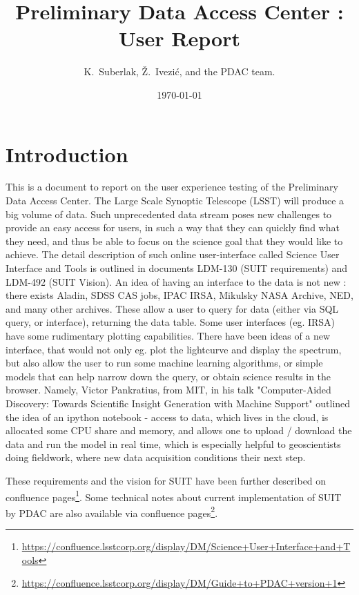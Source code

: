 \documentclass[DM,lsstdraft,toc,usenatbib]{lsstdoc}
\title[PDAC report]{Preliminary Data Access Center : User Report}
\author{
K.~Suberlak,
\v{Z}.~Ivezi\'c,
and the PDAC team.}
\date{\today}
\begin{document}
\maketitle

\section{Introduction}

This is a document to report on the user experience testing of the Preliminary Data Access Center.  The Large Scale Synoptic Telescope      (LSST)  will  produce a big volume of data. Such unprecedented data stream poses new challenges  to provide an easy access for users, in such a way that they can quickly find what they need, and thus be able to focus on the science goal that they would like to achieve.  The detail description of  such online user-interface called Science User Interface and Tools is outlined in documents LDM-130 (SUIT requirements)  and LDM-492  (SUIT Vision).  
An idea of having an interface to the data is not new : there exists Aladin,  SDSS CAS jobs,  IPAC  IRSA,  Mikulsky NASA Archive, NED, and many other archives. These allow a user to query for data (either via SQL query, or interface), returning the data table. Some user interfaces (eg. IRSA) have some rudimentary plotting capabilities.  There have been ideas of a new  interface, that would not only eg. plot the lightcurve and display the spectrum,  but also allow the user to run some machine learning algorithms, or simple models that can help narrow down the query, or obtain science results in the browser.  Namely, Victor Pankratius, from MIT, in his talk   "Computer-Aided Discovery: Towards Scientific Insight Generation with Machine Support"  outlined the idea of an ipython notebook - access to data, which lives in the cloud, is allocated some CPU  share and memory,  and allows one to upload / download the data and run the model in real time, which is especially helpful to geoscientists doing fieldwork, where new data acquisition conditions their next step.  

These requirements and the vision for SUIT have been further described on confluence pages\footnote{\url{https://confluence.lsstcorp.org/display/DM/Science+User+Interface+and+Tools}}. Some technical notes about current implementation of SUIT by PDAC are also available via confluence pages\footnote{\url{https://confluence.lsstcorp.org/display/DM/Guide+to+PDAC+version+1}\label{note1}}. 
\end{document}
